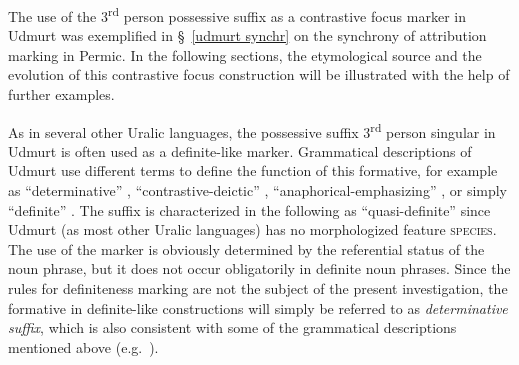 The use of the 3\textsuperscript{rd} person possessive suffix as a contrastive focus marker in Udmurt was exemplified in \S~\ref{udmurt synchr} on the synchrony of attribution marking in Permic. In the following sections, the etymological source and the evolution of this contrastive focus construction will be illustrated with the help of further examples.

As in several other Uralic languages, the possessive suffix 3\textsuperscript{rd} person singular in Udmurt is often used as a definite-like marker. Grammatical descriptions of Udmurt use different terms to define the function of this formative, for example as “determinative” \citep{kelmakov-etal1999}, “contrastive-deictic” \citep{alatyrev1970}, “anaphorical-emphasizing” \citep{kiekbaev1965}, or simply “definite” \citep{winkler2001}. The suffix is characterized in the following as “quasi-definite” since Udmurt (as most other Uralic languages) has no morphologized feature \textsc{species}. The use of the marker is obviously determined by the referential status of the noun phrase, but it does not occur obligatorily in definite noun phrases. Since the rules for definiteness marking are not the subject of the present investigation, the formative in definite-like constructions will simply be referred to as \textit{determinative suffix}, which is also consistent with some of the grammatical descriptions mentioned above (e.g.~\citealt{kelmakov-etal1999}).

